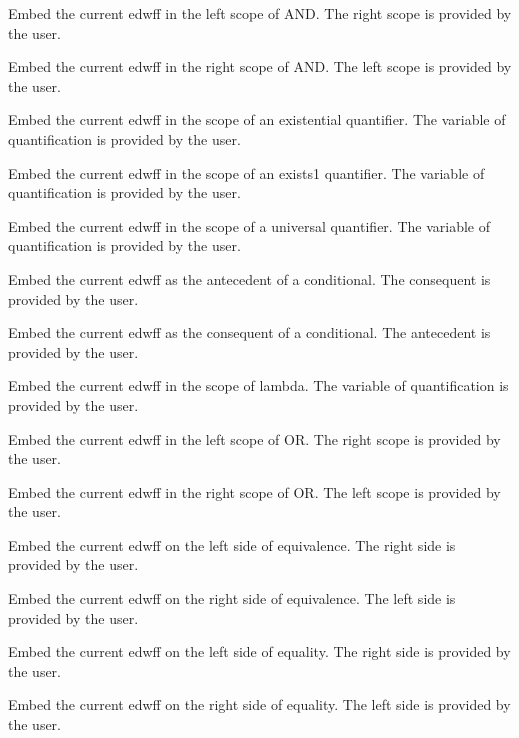 \begin{description} 
\item[MBED-AL]  
Embed the current edwff in the left scope of AND. 
The right scope is provided by the user.

\item[MBED-AR]  
Embed the current edwff in the right scope of AND. 
The left scope is provided by the user.

\item[MBED-E]  
Embed the current edwff in the scope of an existential quantifier. 
The variable of quantification is provided by the user.

\item[MBED-E1]  
Embed the current edwff in the scope of an exists1 quantifier. 
The variable of quantification is provided by the user.

\item[MBED-F]  
Embed the current edwff in the scope of a universal quantifier. 
The variable of quantification is provided by the user.

\item[MBED-IL]  
Embed the current edwff as the antecedent of a conditional. 
The consequent is provided by the user.

\item[MBED-IR]  
Embed the current edwff as the consequent of a conditional. 
The antecedent is provided by the user.

\item[MBED-L]  
Embed the current edwff in the scope of lambda. 
The variable of quantification is provided by the user.

\item[MBED-OL]  
Embed the current edwff in the left scope of OR. 
The right scope is provided by the user.

\item[MBED-OR]  
Embed the current edwff in the right scope of OR. 
The left scope is provided by the user.

\item[MBED-QL]  
Embed the current edwff on the left side of equivalence. 
The right side is provided by the user.

\item[MBED-QR]  
Embed the current edwff on the right side of equivalence. 
The left side is provided by the user.

\item[MBED=L]  
Embed the current edwff on the left side of equality. 
The right side is provided by the user.

\item[MBED=R]  
Embed the current edwff on the right side of equality. 
The left side is provided by the user.
\item
\end{description}

